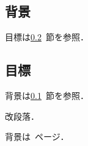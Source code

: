 \documentclass{jsarticle}
\begin{document}
\subsection{背景}\label{sec:back}
目標は\ref{sec:goal}~節を参照．
\subsection{目標}\label{sec:goal}
背景は\ref{sec:back}~節を参照．\par
改段落．\par
背景は~\pageref{sec:back}ページ．
\end{document}
